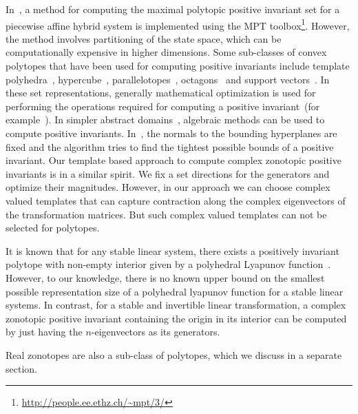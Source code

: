 In~\cite{rakovic2004computation}, a method for computing the maximal
polytopic positive invariant set for a piecewise affine hybrid system
is implemented using the MPT
toolbox\footnote{\url{http://people.ee.ethz.ch/~mpt/3/}}.  However,
the method involves partitioning of the state space, which can be
computationally expensive in higher dimensions.  Some sub-classes of
convex polytopes that have been used for computing positive invariants
include template
polyhedra~\cite{Gawlitza,Sankaranarayanan+Dang+Ivancic-08-Symbolic},
hypercube~\cite{cousot1976static,tiwari2008generating},
parallelotopes~\cite{amato2012abstract},
octagons~\cite{DBLP:journals/lisp/Mine06} and support
vectors~\cite{FLD+11}. In these set representations, generally
mathematical optimization is used for performing the operations
required for computing a positive invariant~(for
example~\cite{Gawlitza,dang1998reachability}).  In simpler abstract
domains~\cite{DBLP:journals/lisp/Mine06,cousot1976static,amato2012abstract},
algebraic methods can be used to compute positive invariants.
In~\cite{Gawlitza}, the normals to the bounding hyperplanes are fixed
and the algorithm tries to find the tightest possible bounds
of a positive invariant.  Our template based approach to
compute complex zonotopic positive invariants is in a similar spirit.
We fix a set directions for the generators and optimize their
magnitudes.  However, in our approach we can choose complex valued
templates that can capture contraction along the complex eigenvectors
of the transformation matrices.  But such complex valued templates can
not be selected for polytopes.

It is known that for any stable linear system, there exists a
positively invariant polytope with non-empty interior given by a
polyhedral Lyapunov function~\cite{blanchini2008set}.  However, to our
knowledge, there is no known upper bound on the smallest possible
representation size of a polyhedral lyapunov function for a stable
linear systems.  In contrast, for a stable and invertible linear
transformation, a complex zonotopic positive invariant containing the
origin in its interior can be computed by just having the
$n$-eigenvectors as its generators.

Real zonotopes are also a sub-class of polytopes, which we discuss in
a separate section.

          
